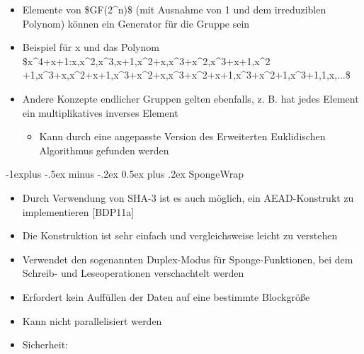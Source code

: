 \documentclass[a4paper]{article}
\makeatletter
\renewcommand{\subsection}{\@startsection{subsection}{2}{0mm}%
 {-1explus -.5ex minus -.2ex}%
 {0.5ex plus .2ex}%
 {\normalfont\normalsize\bfseries}}
\makeatother
\begin{document}
\begin{multicols}{3}
\begin{itemize}
              \begin{itemize}
                  \item
                        \$x\^{}3 +x+1\textbackslash circ x\^{}2+x =
                        x\^{}5+x\^{}3+x\^{}2\textbackslash oplus
                        x\^{}4+x\^{}2+x\textbackslash{} MOD\textbackslash{}
                        x\^{}4+x+1=x\^{}5+x\^{}4+x\^{}3+x\textbackslash{}
                        MOD\textbackslash{} x\^{}4+x+1 = x\^{}3 +x\^{}2 +x+1\$
              \end{itemize}
        \item
              Elemente von \$GF(2\^{}n)\$ (mit Ausnahme von 1 und dem irreduziblen
              Polynom) können ein Generator für die Gruppe sein
        \item
              Beispiel für x und das Polynom
              \$x\^{}4+x+1:x,x\^{}2,x\^{}3,x+1,x\^{}2+x,x\^{}3+x\^{}2,x\^{}3+x+1,x\^{}2
              +1,x\^{}3+x,x\^{}2+x+1,x\^{}3+x\^{}2+x,x\^{}3+x\^{}2+x+1,x\^{}3+x\^{}2+1,x\^{}3+1,1,x,...\$
        \item
              Andere Konzepte endlicher Gruppen gelten ebenfalls, z. B. hat jedes
              Element ein multiplikatives inverses Element

              \begin{itemize}
                  \item
                        Kann durch eine angepasste Version des Erweiterten Euklidischen
                        Algorithmus gefunden werden
              \end{itemize}
    \end{itemize}


    \subsection{SpongeWrap}

    \begin{itemize}
        \item
              Durch Verwendung von SHA-3 ist es auch möglich, ein AEAD-Konstrukt zu
              implementieren {[}BDP11a{]}
        \item
              Die Konstruktion ist sehr einfach und vergleichsweise leicht zu
              verstehen
        \item
              Verwendet den sogenannten Duplex-Modus für Sponge-Funktionen, bei dem
              Schreib- und Leseoperationen verschachtelt werden
        \item
              Erfordert kein Auffüllen der Daten auf eine bestimmte Blockgröße
        \item
              Kann nicht parallelisiert werden
        \item
              Sicherheit:


\end{itemize}
\end{multicols}
\end{document}
